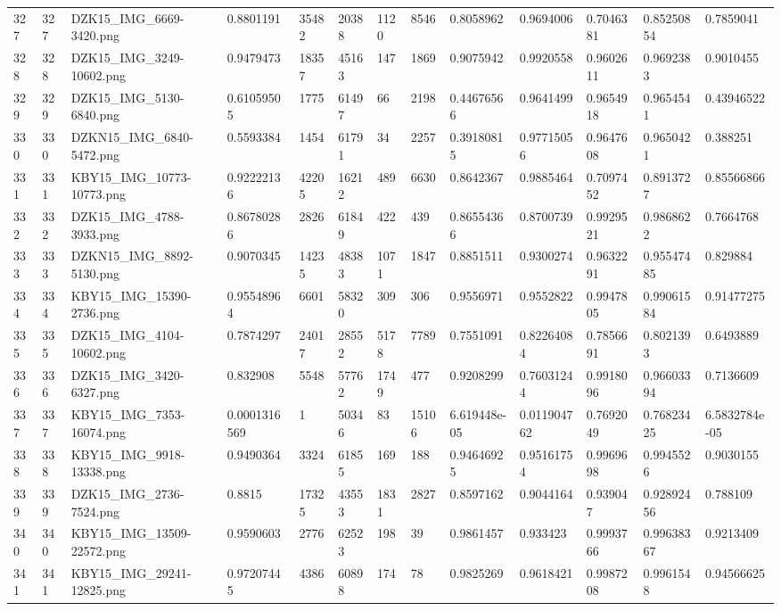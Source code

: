 \documentclass[11pt, a4paper, twoside]{report}
\begin{document}
\begin{longtable}[c]{@{}lllllllllllll@{}}
327 & 327 & DZK15\_IMG\_6669-3420.png & 0.8801191 & 35482 & 20388 & 1120 & 8546 & 0.8058962 & 0.9694006 & 0.7046381 & 0.85250854 & 0.7859041 \\
328 & 328 & DZK15\_IMG\_3249-10602.png & 0.9479473 & 18357 & 45163 & 147 & 1869 & 0.9075942 & 0.9920558 & 0.9602611 & 0.9692383 & 0.9010455 \\
329 & 329 & DZK15\_IMG\_5130-6840.png & 0.61059505 & 1775 & 61497 & 66 & 2198 & 0.44676566 & 0.9641499 & 0.9654918 & 0.9654541 & 0.43946522 \\
330 & 330 & DZKN15\_IMG\_6840-5472.png & 0.5593384 & 1454 & 61791 & 34 & 2257 & 0.39180815 & 0.97715056 & 0.9647608 & 0.9650421 & 0.388251 \\
331 & 331 & KBY15\_IMG\_10773-10773.png & 0.92222136 & 42205 & 16212 & 489 & 6630 & 0.8642367 & 0.9885464 & 0.7097452 & 0.8913727 & 0.85566866 \\
332 & 332 & DZK15\_IMG\_4788-3933.png & 0.86780286 & 2826 & 61849 & 422 & 439 & 0.86554366 & 0.8700739 & 0.9929521 & 0.9868622 & 0.7664768 \\
333 & 333 & DZKN15\_IMG\_8892-5130.png & 0.9070345 & 14235 & 48383 & 1071 & 1847 & 0.8851511 & 0.9300274 & 0.9632291 & 0.95547485 & 0.829884 \\
334 & 334 & KBY15\_IMG\_15390-2736.png & 0.95548964 & 6601 & 58320 & 309 & 306 & 0.9556971 & 0.9552822 & 0.9947805 & 0.99061584 & 0.91477275 \\
335 & 335 & DZK15\_IMG\_4104-10602.png & 0.7874297 & 24017 & 28552 & 5178 & 7789 & 0.7551091 & 0.82264084 & 0.7856691 & 0.8021393 & 0.6493889 \\
336 & 336 & DZK15\_IMG\_3420-6327.png & 0.832908 & 5548 & 57762 & 1749 & 477 & 0.9208299 & 0.76031244 & 0.9918096 & 0.96603394 & 0.7136609 \\
337 & 337 & KBY15\_IMG\_7353-16074.png & 0.0001316569 & 1 & 50346 & 83 & 15106 & 6.619448e-05 & 0.011904762 & 0.7692049 & 0.76823425 & 6.5832784e-05 \\
338 & 338 & KBY15\_IMG\_9918-13338.png & 0.9490364 & 3324 & 61855 & 169 & 188 & 0.94646925 & 0.95161754 & 0.9969698 & 0.9945526 & 0.9030155 \\
339 & 339 & DZK15\_IMG\_2736-7524.png & 0.8815 & 17325 & 43553 & 1831 & 2827 & 0.8597162 & 0.9044164 & 0.939047 & 0.92892456 & 0.788109 \\
340 & 340 & KBY15\_IMG\_13509-22572.png & 0.9590603 & 2776 & 62523 & 198 & 39 & 0.9861457 & 0.933423 & 0.9993766 & 0.99638367 & 0.9213409 \\
341 & 341 & KBY15\_IMG\_29241-12825.png & 0.97207445 & 4386 & 60898 & 174 & 78 & 0.9825269 & 0.9618421 & 0.9987208 & 0.9961548 & 0.94566625 \\

\end{longtable}
\end{document}
